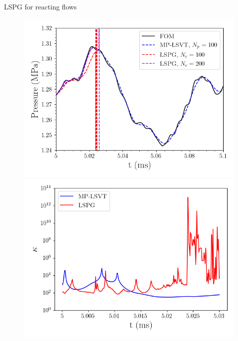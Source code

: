 \documentclass[]{beamer}
\begin{document}
\begin{frame}[noframenumbering]{LSPG for reacting flows}
	\begin{figure}
		\begin{minipage}{0.49\linewidth}
			\includegraphics[width=0.99\linewidth]{Images/experiments/cvrc/backup/pressure_probe_unsampled_lspg.png}
		\end{minipage}
		\begin{minipage}{0.49\linewidth}
			\includegraphics[width=0.99\linewidth]{Images/experiments/cvrc/backup/condition_number.png}
		\end{minipage}
	\end{figure}
\end{frame}
\end{document}
